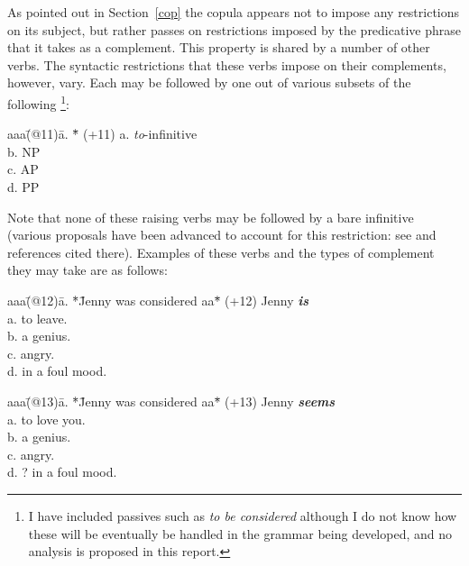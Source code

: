 \label{raise}
As pointed out in Section~\ref{cop} the copula appears not to impose any
restrictions on its subject, but rather passes on restrictions imposed
by the predicative phrase that it takes as a complement. This property is
shared by a number of other verbs. The syntactic restrictions that these
verbs impose on their complements, however, vary. Each may be followed
by one out of various subsets of the following%
%
\footnote{I have included passives such as {\em to be considered}
although I do not know how these will be eventually be handled in the
grammar being developed, and no analysis is proposed in this report.}: 
%
\begin{tabbing}
aaa\=(@11)\= a. \= *\= \kill
   \>(+11)\> a. \>  \> {\em to\/}-infinitive      \\
   \>  \>    b. \>  \> NP   \\
   \>  \>    c. \>  \> AP   \\
   \>  \>    d. \>  \> PP
\end{tabbing}
Note that none of these raising verbs may be followed by a bare
infinitive (various proposals have been advanced to account for this
restriction: see \cite{ksh87} and references cited there).
Examples of these verbs and the types of complement they may take are as
follows: 
\begin{tabbing}
aaa\=(@12)\= a. \= *\= Jenny was considered aa\= *\=        \kill
   \>(+12)\>    \>  \> Jenny {\em \bf is}                \\
   \>     \> a. \>  \>                  \>  \> to leave. \\
   \>     \> b. \>  \>                  \>  \> a genius.    \\    
   \>     \> c. \>  \>                  \>  \> angry.    \\    
   \>     \> d. \>  \>                  \>  \> in a foul mood.
\end{tabbing}
\begin{tabbing}
aaa\=(@13)\= a. \= *\= Jenny was considered aa\= *\=        \kill
   \>(+13)\>    \>  \> Jenny {\em \bf seems}                \\
   \>     \> a. \>  \>                  \>  \> to love you. \\
   \>     \> b. \>  \>                  \>  \> a genius.    \\    
   \>     \> c. \>  \>                  \>  \> angry.    \\    
   \>     \> d. \>  \>                  \> ?\> in a foul mood.
\end{tabbing}
